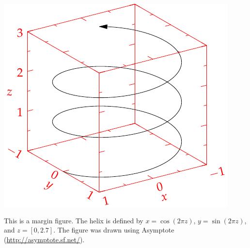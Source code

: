 \documentclass{article}
\begin{document}
\begin{marginfigure}%
  \includegraphics[width=\linewidth]{figures/helix}
  \caption{This is a margin figure.  The helix is defined by 
    $x = \cos(2\pi z)$, $y = \sin(2\pi z)$, and $z = [0, 2.7]$.  The figure was
    drawn using Asymptote (\url{http://asymptote.sf.net/}).}
  \label{fig:marginfig}
\end{marginfigure}
\end{document}
